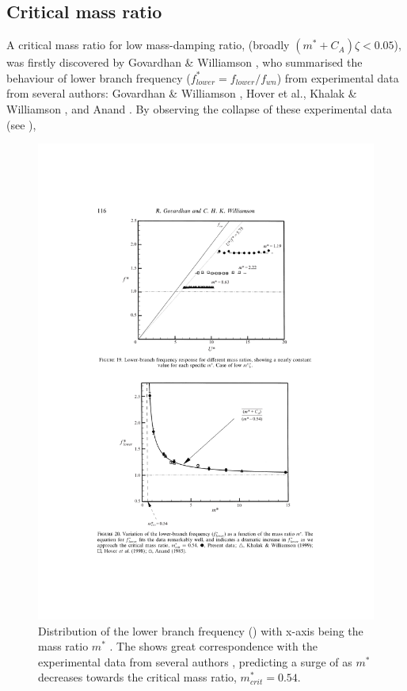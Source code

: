 \subsection{Critical mass ratio}
A critical mass ratio for low mass-damping ratio, (broadly $(m^*+C_A)\zeta < 0.05$), was firstly discovered by Govardhan \& Williamson \cite{GOVARDHAN2000}, who summarised the behaviour of lower branch frequency ($f^*_{lower}=f_{lower}/f_{wn}$) from experimental data from several authors: Govardhan \& Williamson \cite{GOVARDHAN2000}, Hover et al.\@ \cite{Hover1998}, Khalak \& Williamson \cite{KHALAK1999}, and Anand \cite{Torum1985}. By observing the collapse of these experimental data (see ),
\begin{figure}
	\centering
	\captionsetup{justification=centering}
	\includegraphics[width=0.7\linewidth]{"Figs/equation 61"}
	\caption{Distribution of the lower branch frequency (\fslower{}) with x-axis being the mass ratio $m^*$ \cite{GOVARDHAN2000}. The  shows great correspondence with the experimental data from several authors \cite{GOVARDHAN2000,Hover1998, KHALAK1999,Torum1985}, predicting a surge of \fslower{} as $m^*$ decreases towards the critical mass ratio, $m^*_{crit}=0.54$.
	}
	\label{fig:equation-61}
\end{figure}

